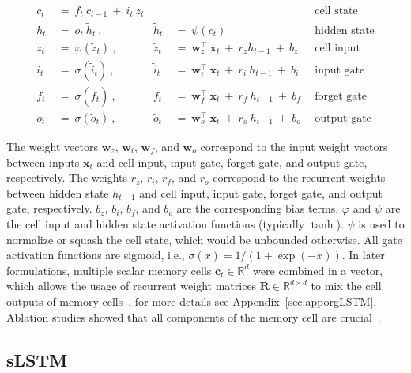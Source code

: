 \begin{align}
c_t \ &= \  f_t \ c_{t-1} \ + \ i_t \ z_t &  & &\text{cell state} \\
h_t  \ &= \ o_t \ \tilde{h}_t \ , & \tilde{h}_t \ &= \ \psi \left( c_t\right)
  &\text{hidden state} \\
z_t \ &= \ \varphi \left( \tilde{z}_t \right) \ , 
  &\tilde{z}_t \ &=  \ \mathbf{w}^\top_{z} \ \mathbf{x}_t \ + \
  r_{z}  h_{t-1} \ + \  b_{z} \ \
  &\text{cell input} \\
i_t \ &= \ \sigma \left( \tilde{i}_t  \right) \ , 
  &\tilde{i}_t \ &= \ \mathbf{w}^\top_{i} \ \mathbf{x}_t \ + \
  r_{i}  \ h_{t-1} \ + \  b_{i} \ \
  &\text{input gate} \\
f_t \ &= \ \sigma \left(  \tilde{f}_t \right) \ , 
  &\tilde{f}_t \ &= \ \mathbf{w}^\top_{f} \ \mathbf{x}_t  \ + \
  r_{f}  \ h_{t-1} \ + \  b_{f} \ \
  &\text{forget gate} \\
o_t \ &= \ \sigma \left( \tilde{o}_t \right) \ , 
  &\tilde{o}_t  \ &= \ \mathbf{w}^\top_{o} \ \mathbf{x}_t \ + \
  r_{o}  \ h_{t-1} \ + \  b_{o} \ \
  &\text{output gate} 
\end{align}

The weight vectors $\mathbf{w}_{z}$, $\mathbf{w}_{i}$,
$\mathbf{w}_{f}$, and $\mathbf{w}_{o}$ correspond to the input weight vectors between inputs $\mathbf{x}_t$ and cell input, input gate, forget gate, and output gate, respectively. The weights $r_{z}$, $r_{i}$, $r_{f}$, and $r_{o}$ correspond to the recurrent weights between hidden state $h_{t-1}$ and cell input, input gate, forget gate, and output gate, respectively. $b_{z}$, $b_{i}$, $b_{f}$, and $b_{o}$ are the corresponding bias terms.
$\varphi$ and $\psi$ are the cell input and hidden state activation functions (typically $\tanh$). 
$\psi$ is used to normalize or squash the cell state, which would be unbounded otherwise. All gate activation functions are sigmoid, i.e.,
$\sigma \left( x \right)= 1/(1+\exp(-x))$.
In later formulations, multiple scalar memory cells $\mathbf{c}_t \in \mathbb{R}^{d}$ were combined in a vector, which allows the usage of recurrent weight matrices $\mathbf{R} \in \mathbb{R}^{d \times d}$ to mix the cell outputs of memory cells~\citep{Greff:15}, for more details see Appendix~\ref{sec:apporgLSTM}. 
Ablation studies showed that all components of the memory cell are crucial~\citep{Greff:15}. 

\subsection{sLSTM}
\label{sec:sLSTM}

